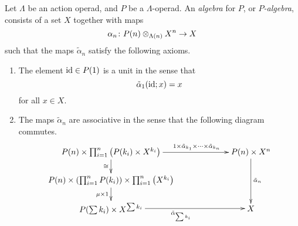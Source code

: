 \begin{Defi}[($P$-algebras)]\label{Defi:aop-alg}
Let $\Lambda$ be an action operad, and $P$ be a $\Lambda$-operad. An \textit{algebra} for $P$, or \emph{$P$-algebra}, consists of a set $X$ together with maps 
\[
\alpha_{n} \colon P(n) \otimes_{\Lambda(n)} X^{n} \rightarrow X
\]
such that the maps $\tilde{\alpha}_{n}$ satisfy the following axioms.
\begin{enumerate}
\item The element $\textrm{id} \in P(1)$ is a unit in the sense that
  \[
    \tilde{\alpha}_{1}(\textrm{id}; x) = x
  \]
for all $x \in X$.
\item The maps $\tilde{\alpha}_{n}$ are associative in the sense that the following diagram commutes.
  \[
    \xy
      (0,0)*+{P(n) \times \prod_{i=1}^n \left(P(k_i) \times X^{k_i}\right)}="ul";
      (60,0)*+{P(n) \times X^{n}}="ur";
      (0,-12)*+{P(n) \times \left(\prod_{i=1}^n P(k_i)\right) \times \prod_{i=1}^n \left(X^{k_i}\right) }="ml";
      (0,-24)*+{P(\sum k_{i}) \times X^{\sum k_{i}}}="bl";
      (60,-24)*+{X}="br";
      {\ar^>>>>>>>>>>>>>>{1 \times \tilde{\alpha}_{k_{1}} \times \cdots \times \tilde{\alpha}_{k_{n}}} "ul"; "ur"};
      {\ar^{\tilde{\alpha}_{n}} "ur"; "br"};
      {\ar_{\cong} "ul"; "ml"};
      {\ar_{\mu \times 1} "ml"; "bl"};
      {\ar_{\tilde{\alpha}_{\sum k_{i}}} "bl"; "br"};
    \endxy
  \]
\end{enumerate}
\end{Defi}

